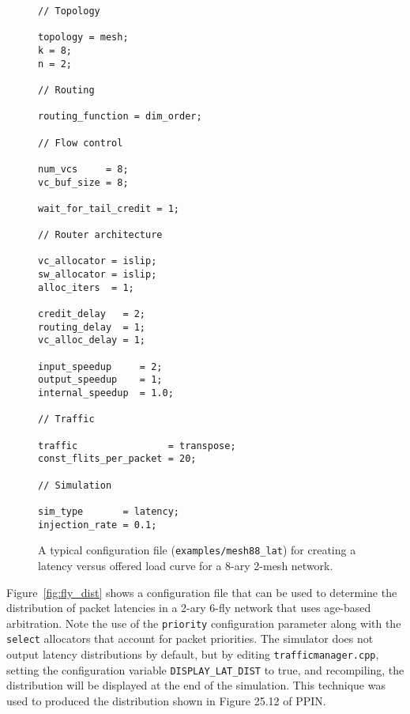 \documentclass[11pt]{article}
\begin{document}
\begin{figure}
\begin{verbatim}
// Topology

topology = mesh;
k = 8;
n = 2;

// Routing

routing_function = dim_order;

// Flow control

num_vcs     = 8;
vc_buf_size = 8;

wait_for_tail_credit = 1;

// Router architecture

vc_allocator = islip;
sw_allocator = islip;
alloc_iters  = 1;

credit_delay   = 2;
routing_delay  = 1;
vc_alloc_delay = 1;

input_speedup     = 2;
output_speedup    = 1;
internal_speedup  = 1.0;

// Traffic

traffic                = transpose;
const_flits_per_packet = 20;

// Simulation

sim_type       = latency;
injection_rate = 0.1;
\end{verbatim}
\caption{A typical configuration file (\texttt{examples/mesh88\_lat})
for creating a latency versus offered load curve for a 8-ary 2-mesh
network.}
\label{fig:lat_vs_load}
\end{figure}

Figure~\ref{fig:fly_dist} shows a configuration file that can be used
to determine the distribution of packet latencies in a 2-ary 6-fly
network that uses age-based arbitration.  Note the use of the
\texttt{priority} configuration parameter along with the
\texttt{select} allocators that account for packet priorities.  The
simulator does not output latency distributions by default, but by
editing \texttt{trafficmanager.cpp}, setting the configuration
variable \texttt{DISPLAY\_LAT\_DIST} to true, and recompiling, the
distribution will be displayed at the end of the simulation.  This
technique was used to produced the distribution shown in Figure 25.12
of PPIN.
\end{document}
